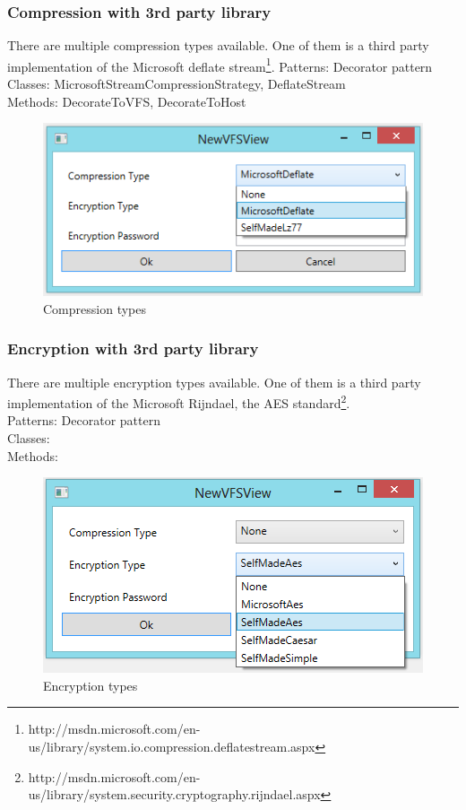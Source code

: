 \documentclass[JCDReport.tex]{subfiles}
\begin{document}
\subsubsection{Compression with 3rd party library}
There are multiple compression types available. One of them is a third party implementation of the Microsoft deflate stream\footnote{http://msdn.microsoft.com/en-us/library/system.io.compression.deflatestream.aspx}.
Patterns: Decorator pattern\\
Classes: MicrosoftStreamCompressionStrategy, DeflateStream\\
Methods: DecorateToVFS, DecorateToHost\\
\begin{figure}[h!]
	\centering
	\includegraphics[scale=1]{Images/compression_types.png} 
	\caption{Compression types}
\end{figure}

\subsubsection{Encryption with 3rd party library}
There are multiple encryption types available. One of them is a third party implementation of the Microsoft Rijndael, the AES standard\footnote{http://msdn.microsoft.com/en-us/library/system.security.cryptography.rijndael.aspx}.\\
Patterns: Decorator pattern\\
Classes:\\
Methods:
\begin{figure}[h!]
	\centering
	\includegraphics[scale=1]{Images/encryption_types.png} 
	\caption{Encryption types}
\end{figure}
\end{document}
